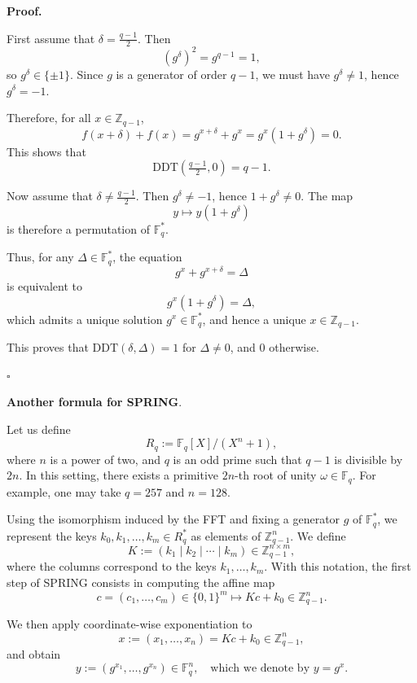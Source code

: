 \documentclass{article}
\begin{document}
\medskip

\textbf{Proof.}

First assume that $\delta = \frac{q-1}{2}$. Then
\[
(g^\delta)^2 = g^{q-1} = 1,
\]
so $g^\delta \in \{\pm 1\}$. Since $g$ is a generator of order $q-1$, we must have $g^\delta \neq 1$, hence $g^\delta = -1$.

Therefore, for all $x \in \mathbb{Z}_{q-1}$,
\[
f(x+\delta) + f(x) = g^{x+\delta} + g^x = g^x(1 + g^\delta) = 0.
\]
This shows that
\[
\mathrm{DDT}\!\left(\tfrac{q-1}{2}, 0\right) = q-1.
\]

\medskip

Now assume that $\delta \neq \frac{q-1}{2}$. Then $g^\delta \neq -1$, hence $1 + g^\delta \neq 0$. The map
\[
y \mapsto y(1 + g^\delta)
\]
is therefore a permutation of $\mathbb{F}_q^*$.

Thus, for any $\Delta \in \mathbb{F}_q^*$, the equation
\[
g^x + g^{x+\delta} = \Delta
\]
is equivalent to
\[
g^x (1 + g^\delta) = \Delta,
\]
which admits a unique solution $g^x \in \mathbb{F}_q^*$, and hence a unique $x \in \mathbb{Z}_{q-1}$.

This proves that $\mathrm{DDT}(\delta, \Delta) = 1$ for $\Delta \neq 0$, and $0$ otherwise.

\hfill $\square$

\textbf{Another formula for SPRING}.

Let us define
\[
R_q := \mathbb{F}_q[X]/(X^n + 1),
\]
where \(n\) is a power of two, and \(q\) is an odd prime such that \(q-1\) is divisible by \(2n\). In this setting, there exists a primitive \(2n\)-th root of unity \(\omega \in \mathbb{F}_q\). For example, one may take \(q=257\) and \(n=128\).

Using the isomorphism induced by the FFT and fixing a generator \(g\) of \(\mathbb{F}_q^\ast\), we represent the keys
\(k_0, k_1, \dots, k_m \in R_q^\ast\)
as elements of \(\mathbb{Z}_{q-1}^n\). We define
\[
K := (k_1 \mid k_2 \mid \cdots \mid k_m) \in \mathbb{Z}_{q-1}^{n \times m},
\]
where the columns correspond to the keys \(k_1,\dots,k_m\). With this notation, the first step of SPRING consists in computing the affine map
\[
c = (c_1,\dots,c_m) \in \{0,1\}^m \longmapsto Kc + k_0 \in \mathbb{Z}_{q-1}^n.
\]

We then apply coordinate-wise exponentiation to
\[
x := (x_1,\dots,x_n) = Kc + k_0 \in \mathbb{Z}_{q-1}^n,
\]
and obtain
\[
y := (g^{x_1},\dots,g^{x_n}) \in \mathbb{F}_q^n,
\quad \text{which we denote by } y = g^x.
\]

\vspace{0.3cm}
\end{document}
